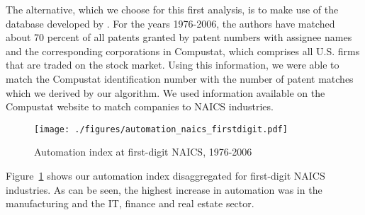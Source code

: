 \documentclass[11pt,a4paper]{article}
\begin{document}
The alternative, which we choose for this first analysis, is to make use of the database developed by \cite{HJT2001}. For the years 1976-2006, the authors have matched about 70 percent of all patents granted by patent numbers with assignee names and the corresponding corporations in Compustat, which comprises all U.S. firms that are traded on the stock market. Using this information, we were able to match the Compustat identification number with the number of patent matches which we derived by our algorithm. We used information available on the Compustat website to match companies to NAICS industries. 

\begin{figure}[tb]
	\caption{Automation index at first-digit NAICS, 1976-2006}
	\centering
	\texttt{[image: ./figures/automation\_naics\_firstdigit.pdf]}\\
	\label{fig:automation_naics_firstdigit}
\end{figure}


Figure~\ref{fig:automation_naics_firstdigit} shows our automation index disaggregated for first-digit NAICS industries. As can be seen, the highest increase in automation was in the manufacturing and the IT, finance and real estate sector. 




\end{document}
